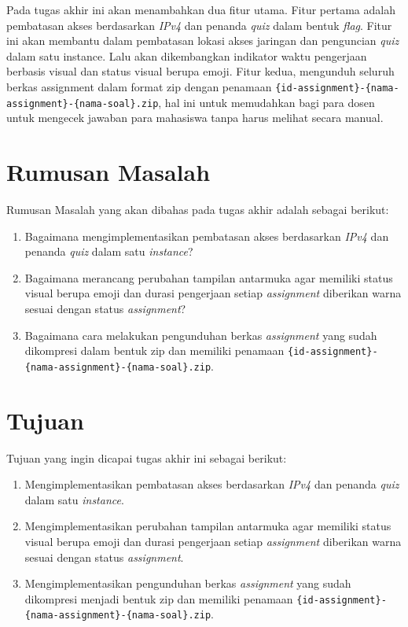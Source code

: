 \documentclass[a4paper,twoside]{article}
\begin{document}
	Pada tugas akhir ini akan menambahkan dua fitur utama. Fitur pertama adalah pembatasan akses berdasarkan \textit{IPv4} dan penanda \textit{quiz} dalam bentuk \textit{flag}. Fitur ini akan membantu dalam pembatasan lokasi akses jaringan dan penguncian \textit{quiz} dalam satu instance. Lalu akan dikembangkan indikator waktu pengerjaan berbasis visual dan status visual berupa emoji. Fitur kedua, mengunduh seluruh berkas assignment dalam format zip dengan penamaan \texttt{\{id-assignment\}-\{nama-assignment\}-\{nama-soal\}.zip}, hal ini untuk memudahkan bagi para dosen untuk mengecek jawaban para mahasiswa tanpa harus melihat secara manual.
		
\section{Rumusan Masalah}
Rumusan Masalah yang akan dibahas pada tugas akhir adalah sebagai berikut:

	\begin{enumerate}
     \item Bagaimana mengimplementasikan pembatasan akses berdasarkan \textit{IPv4} dan penanda \textit{quiz} dalam satu \textit{instance}?
     \item Bagaimana merancang perubahan tampilan antarmuka agar memiliki status visual berupa emoji dan durasi pengerjaan setiap \textit{assignment} diberikan warna sesuai dengan status \textit{assignment}?
     \item Bagaimana cara melakukan pengunduhan berkas \textit{assignment} yang sudah dikompresi dalam bentuk zip dan memiliki penamaan \texttt{\{id-assignment\}-\{nama-assignment\}-\{nama-soal\}.zip}.
 	\end{enumerate}

\section{Tujuan}

Tujuan yang ingin dicapai tugas akhir ini sebagai berikut:
	\begin{enumerate}
     \item Mengimplementasikan pembatasan akses berdasarkan \textit{IPv4} dan penanda \textit{quiz} dalam satu \textit{instance}.
     \item Mengimplementasikan perubahan tampilan antarmuka agar memiliki status visual berupa emoji dan durasi pengerjaan setiap \textit{assignment} diberikan warna sesuai dengan status \textit{assignment}.
     \item Mengimplementasikan pengunduhan berkas \textit{assignment} yang sudah dikompresi menjadi bentuk zip dan memiliki penamaan \texttt{\{id-assignment\}-\{nama-assignment\}-\{nama-soal\}.zip}.
 	\end{enumerate}
\end{document}
